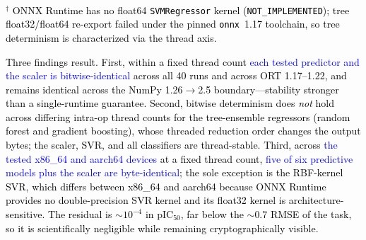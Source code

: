 \documentclass[conference]{IEEEtran}
\newcommand{\rev}[2]{\textcolor{blue}{#2}}
\begin{document}
\begin{table}[!htbp]
\centering
\caption{\textcolor{black}{Per-model determinism
characterization: within-configuration (40 runs), across
intra-op thread counts, across ONNX Runtime 1.17--1.22, and
dtype residual versus the sklearn float64 reference.}}
\label{tab:determinism-detail}
\\[2pt]
{\footnotesize \textcolor{black}{$^\dagger$ ONNX Runtime has no
float64 \texttt{SVMRegressor} kernel (\texttt{NOT\_IMPLEMENTED});
tree float32/float64 re-export failed under the pinned
\texttt{onnx}~1.17 toolchain, so tree determinism is
characterized via the thread axis.}}
\end{table}

\textcolor{black}{Three findings result. First, within a fixed
thread count \rev{R2.1}{each tested predictor and the scaler is bitwise-identical} across all 40
runs and across ORT 1.17--1.22, and remains identical across
the NumPy 1.26$\rightarrow$2.5 boundary---stability stronger
than a single-runtime guarantee. Second, bitwise determinism
does \emph{not} hold across differing intra-op thread counts
for the tree-ensemble regressors (random forest and gradient
boosting), whose threaded reduction order changes the output
bytes; the scaler, SVR, and all classifiers are thread-stable.
Third, across \rev{R1.1}{the tested x86\_64 and aarch64 devices} at a fixed thread count,
\rev{R1.1, R2.1}{five of six predictive models plus the scaler are byte-identical}; the sole exception is
the RBF-kernel SVR, which differs between x86\_64 and aarch64
because ONNX Runtime provides no double-precision SVR kernel
and its float32 kernel is architecture-sensitive. The residual
is $\sim$$10^{-4}$ in pIC$_{50}$, far below the $\sim$0.7 RMSE
of the task, so it is scientifically negligible while remaining
cryptographically visible.}
\end{document}
